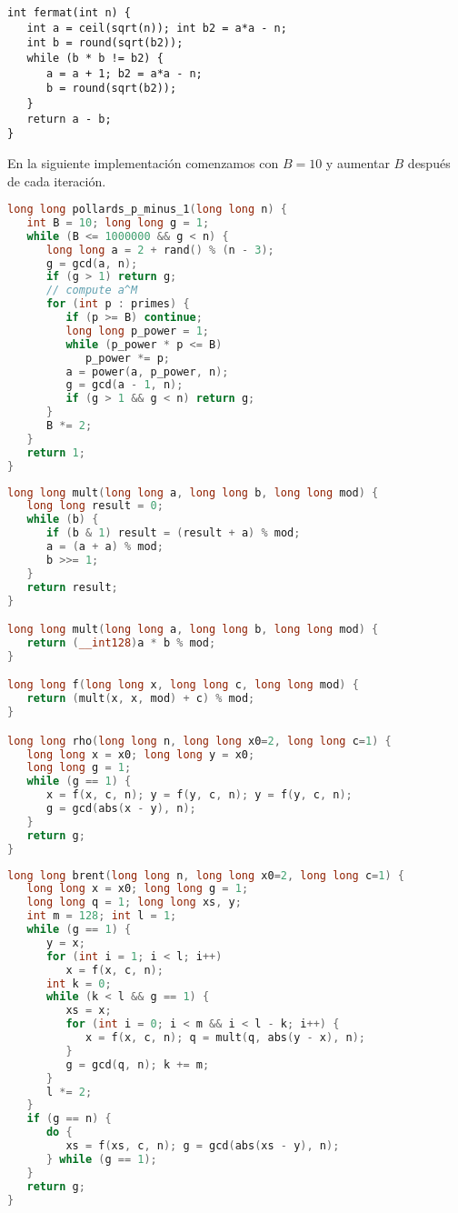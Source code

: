 \begin{lstlisting}
int fermat(int n) {
   int a = ceil(sqrt(n)); int b2 = a*a - n;
   int b = round(sqrt(b2));
   while (b * b != b2) {
      a = a + 1; b2 = a*a - n;
      b = round(sqrt(b2));
   }
   return a - b;
}
\end{lstlisting}

En la siguiente implementación comenzamos con $B=10$ y aumentar $B$ después de cada iteración.
\begin{lstlisting}[language=C++]
long long pollards_p_minus_1(long long n) {
   int B = 10; long long g = 1;
   while (B <= 1000000 && g < n) {
      long long a = 2 + rand() % (n - 3);
      g = gcd(a, n);
      if (g > 1) return g;
      // compute a^M
      for (int p : primes) {
         if (p >= B) continue;
         long long p_power = 1;
         while (p_power * p <= B)
            p_power *= p;
         a = power(a, p_power, n);
         g = gcd(a - 1, n);
         if (g > 1 && g < n) return g;
      }
      B *= 2;
   }
   return 1;
}
\end{lstlisting}

\begin{lstlisting}[language=C++]
long long mult(long long a, long long b, long long mod) {
   long long result = 0;
   while (b) {
      if (b & 1) result = (result + a) % mod;
      a = (a + a) % mod;
      b >>= 1;
   }
   return result;
}

long long mult(long long a, long long b, long long mod) {
   return (__int128)a * b % mod;
}

long long f(long long x, long long c, long long mod) {
   return (mult(x, x, mod) + c) % mod;
}

long long rho(long long n, long long x0=2, long long c=1) {
   long long x = x0; long long y = x0;
   long long g = 1;
   while (g == 1) {
      x = f(x, c, n); y = f(y, c, n); y = f(y, c, n);
      g = gcd(abs(x - y), n);
   }
   return g;
}
\end{lstlisting}

\begin{lstlisting}[language=C++]
long long brent(long long n, long long x0=2, long long c=1) {
   long long x = x0; long long g = 1;
   long long q = 1; long long xs, y;
   int m = 128; int l = 1;
   while (g == 1) {
      y = x;
      for (int i = 1; i < l; i++)
         x = f(x, c, n);
      int k = 0;
      while (k < l && g == 1) {
         xs = x;
         for (int i = 0; i < m && i < l - k; i++) {
            x = f(x, c, n); q = mult(q, abs(y - x), n);
         }
         g = gcd(q, n); k += m;
      }
      l *= 2;
   }
   if (g == n) {
      do {
         xs = f(xs, c, n); g = gcd(abs(xs - y), n);
      } while (g == 1);
   }
   return g;
}

\end{lstlisting}


